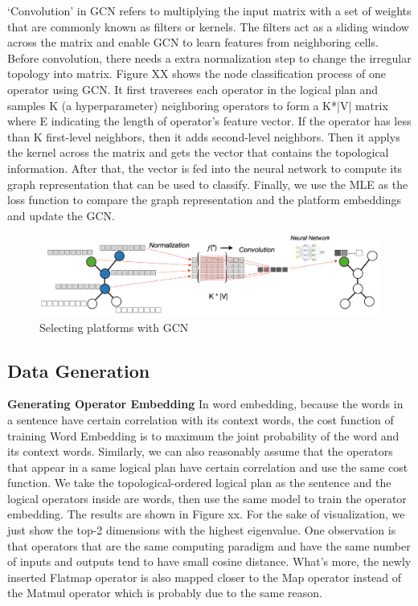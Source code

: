 ‘Convolution’ in GCN refers to multiplying the input matrix with a set of weights that are commonly known as filters or kernels. 
The filters act as a sliding window across the matrix and enable GCN to learn features from neighboring cells. 
Before convolution, there needs a extra normalization step to change the irregular topology into matrix. 
Figure XX shows the node classification process of one operator using GCN. 
It first traverses each operator in the logical plan and samples K (a hyperparameter) neighboring operators to form a K*|V| matrix where E indicating the length of operator's feature vector. 
If the operator has less than K first-level neighbors, then it adds second-level neighbors. 
Then it applys the kernel across the matrix and gets the vector that contains the topological information. 
After that, the vector is fed into the neural network to compute its graph representation that can be used to classify. 
Finally, we use the MLE as the loss function to compare the graph representation and the platform embeddings and update the GCN.


\begin{figure}
  \centering
  \includegraphics[width=\linewidth]{figures/gcn.png}
  \caption{Selecting platforms with GCN}
  \label{fig:gcn}
\end{figure}

\subsection{Data Generation}
\textbf{Generating Operator Embedding}
In word embedding, because the words in a sentence have certain correlation with its context words, 
the cost function of training Word Embedding is to maximum the joint probability of the word and its context words. 
Similarly, we can also reasonably assume that the operators that appear in a same logical plan have certain correlation and use the same cost function. 
We take the topological-ordered logical plan as the sentence and the logical operators inside are words, 
then use the same model to train the operator embedding. The results are shown in Figure xx. 
For the sake of visualization, we just show the top-2 dimensions with the highest eigenvalue. 
One observation is that operators that are the same computing paradigm and have the same number of inputs and outputs tend to have small cosine distance. 
What's more, the newly inserted Flatmap operator is also mapped closer to the Map operator instead of the Matmul operator which is probably due to the same reason.

